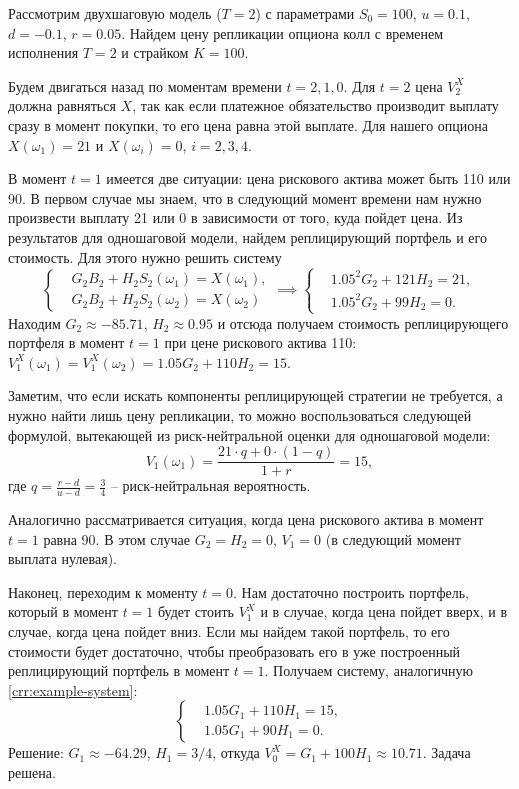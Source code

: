 \begin{example}
\label{crr:example}
Рассмотрим двухшаговую модель ($T=2$) с параметрами $S_0=100$, $u=0.1$, $d=-0.1$, $r=0.05$.
Найдем цену репликации опциона колл с временем исполнения $T=2$ и страйком $K=100$.

Будем двигаться назад по моментам времени $t=2,1,0$.
Для $t=2$ цена $V_2^X$ должна равняться $X$, так как если платежное обязательство производит выплату сразу в момент покупки, то его цена равна этой выплате.
Для нашего опциона $X(\omega_1) = 21$ и $X(\omega_i) = 0$, $i=2,3,4$.

В момент $t=1$ имеется две ситуации: цена рискового актива может быть 110 или 90.
В первом случае мы знаем, что в следующий момент времени нам нужно произвести выплату 21 или 0 в зависимости от того, куда пойдет цена.
Из результатов для одношаговой модели, найдем реплицирующий портфель и его стоимость.
Для этого нужно решить систему
\begin{equation}
\label{crr:example-system}
\left\{
\begin{aligned}
&G_2 B_2 + H_2 S_2(\omega_1) = X(\omega_1), \\
&G_2 B_2 + H_2 S_2(\omega_2) = X(\omega_2)
\end{aligned}
\right. \implies
\left\{
\begin{aligned}
&1.05^2 G_2  + 121 H_2 = 21, \\
&1.05^2 G_2 +  99 H_2 = 0.
\end{aligned}
\right.
\end{equation}
Находим $G_2 \approx -85.71$, $H_2 \approx 0.95$ и отсюда получаем стоимость реплицирующего портфеля в момент $t=1$ при цене рискового актива 110: $V_1^X(\omega_1) = V_1^X(\omega_2) = 1.05 G_2 + 110 H_2 = 15$.

Заметим, что если искать компоненты реплицирующей стратегии не требуется, а нужно найти лишь цену репликации, то можно воспользоваться следующей формулой, вытекающей из риск-нейтральной оценки для одношаговой модели:
\begin{equation}
\label{crr:example-step}
V_1(\omega_1) = \frac{21 \cdot q + 0\cdot (1-q)}{1+r} = 15,
\end{equation}
где $q = \frac{r-d}{u-d} = \frac34$ -- риск-нейтральная вероятность. 

Аналогично рассматривается ситуация, когда цена рискового актива в момент $t=1$ равна 90. В этом случае $G_2=H_2 = 0$, $V_1 = 0$ (в следующий момент выплата нулевая).

Наконец, переходим к моменту $t=0$. Нам достаточно построить портфель, который в момент $t=1$ будет стоить $V_1^X$ и в случае, когда цена пойдет вверх, и в случае, когда цена пойдет вниз. 
Если мы найдем такой портфель, то его стоимости будет достаточно, чтобы преобразовать его в уже построенный реплицирующий портфель в момент $t=1$.
Получаем систему, аналогичную \eqref{crr:example-system}:
\[
\left\{
\begin{aligned}
&1.05 G_1  + 110 H_1 = 15, \\
&1.05 G_1 +  90 H_1 = 0.
\end{aligned}
\right.
\]
Решение: $G_1\approx -64.29$, $H_1=3/4$, откуда $V_0^X = G_1 + 100 H_1 \approx 10.71$.
Задача решена.
\end{example}

